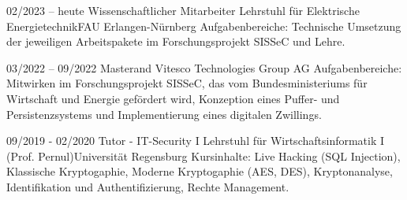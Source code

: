 \vspace{4pt}




\vspace{10pt}
\vspace{4pt}

\cvevent
{02/2023 -- heute}
{Wissenschaftlicher Mitarbeiter}
{Lehrstuhl für Elektrische Energietechnik\newline FAU Erlangen-Nürnberg}
{Aufgabenbereiche: Technische Umsetzung der jeweiligen Arbeitspakete im Forschungsprojekt SISSeC und Lehre. }
\vfill\null

\cvevent
{03/2022 -- 09/2022}
{Masterand}
{\newline Vitesco Technologies Group AG}
{Aufgabenbereiche: Mitwirken im Forschungsprojekt SISSeC, das vom Bundesministeriums für Wirtschaft und Energie gefördert wird, Konzeption eines Puffer- und Persistenzsystems und Implementierung eines digitalen Zwillings. }
\vfill\null

\cvevent
{09/2019 - 02/2020}
{Tutor - IT-Security I}
{Lehrstuhl für Wirtschaftsinformatik I (Prof. Pernul)\newline Universität Regensburg}
{Kursinhalte: Live Hacking (SQL Injection), Klassische Kryptogaphie, Moderne Kryptogaphie (AES, DES), Kryptonanalyse, Identifikation und Authentifizierung, Rechte Management.}
\vfill\null

